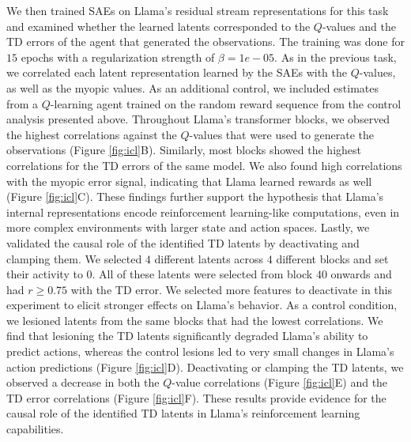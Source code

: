\documentclass{article}
\begin{document}
We then trained SAEs on Llama's residual stream representations for this task and examined whether the learned latents corresponded to the $Q$-values and the TD errors of the agent that generated the observations. The training was done for $15$ epochs with a regularization strength of $\beta=1e-05$. As in the previous task, we correlated each latent representation learned by the SAEs with the $Q$-values, as well as the myopic values. As an additional control, we included estimates from a $Q$-learning agent trained on the random reward sequence from the control analysis presented above. Throughout Llama's transformer blocks, we observed the highest correlations against the $Q$-values that were used to generate the observations (Figure \ref{fig:icl}B). Similarly, most blocks showed the highest correlations for the TD errors of the same model. We also found high correlations with the myopic error signal, indicating that Llama learned rewards as well (Figure \ref{fig:icl}C). These findings further support the hypothesis that Llama's internal representations encode reinforcement learning-like computations, even in more complex environments with larger state and action spaces.
Lastly, we validated the causal role of the identified TD latents by deactivating and clamping them. We selected $4$ different latents across $4$ different blocks and set their activity to $0$. All of these latents were selected from block $40$ onwards and had $r \geq 0.75$ with the TD error. We selected more features to deactivate in this experiment to elicit stronger effects on Llama's behavior. As a control condition, we lesioned latents from the same blocks that had the lowest correlations. We find that lesioning the TD latents significantly degraded Llama's ability to predict actions, whereas the control lesions led to very small changes in Llama's action predictions (Figure \ref{fig:icl}D). Deactivating or clamping the TD latents, we observed a decrease in both the $Q$-value correlations (Figure \ref{fig:icl}E) and the TD error correlations (Figure \ref{fig:icl}F). These results provide evidence for the causal role of the identified TD latents in Llama's reinforcement learning capabilities.
\end{document}
